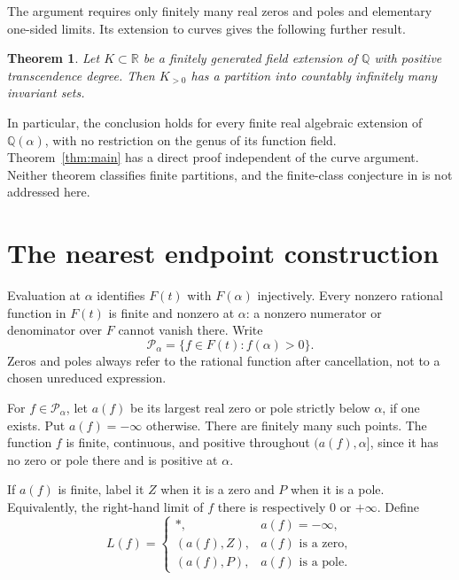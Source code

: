 \documentclass[11pt]{article}
\newtheorem{theorem}{Theorem}
\theoremstyle{remark}
\newcommand{\Q}{\mathbb Q}
\newcommand{\R}{\mathbb R}
\begin{document}
The argument requires only finitely many real zeros and poles and elementary one-sided limits. Its extension to curves gives the following further result.

\begin{theorem}\label{thm:fields}
Let $K\subset\R$ be a finitely generated field extension of $\Q$ with positive transcendence degree. Then $K_{>0}$ has a partition into countably infinitely many invariant sets.
\end{theorem}

In particular, the conclusion holds for every finite real algebraic extension of $\Q(\alpha)$, with no restriction on the genus of its function field. Theorem~\ref{thm:main} has a direct proof independent of the curve argument. Neither theorem classifies finite partitions, and the finite-class conjecture in \cite[Section~7]{KST} is not addressed here.

\section{The nearest endpoint construction}
Evaluation at $\alpha$ identifies $F(t)$ with $F(\alpha)$ injectively. Every nonzero rational function in $F(t)$ is finite and nonzero at $\alpha$: a nonzero numerator or denominator over $F$ cannot vanish there. Write
\[
 \mathcal P_\alpha=\{f\in F(t): f(\alpha)>0\}.
\]
Zeros and poles always refer to the rational function after cancellation, not to a chosen unreduced expression.

For $f\in\mathcal P_\alpha$, let $a(f)$ be its largest real zero or pole strictly below $\alpha$, if one exists. Put $a(f)=-\infty$ otherwise. There are finitely many such points. The function $f$ is finite, continuous, and positive throughout $(a(f),\alpha]$, since it has no zero or pole there and is positive at $\alpha$.

If $a(f)$ is finite, label it $Z$ when it is a zero and $P$ when it is a pole. Equivalently, the right-hand limit of $f$ there is respectively $0$ or $+\infty$. Define
\begin{equation}\label{eq:leftlabel}
 L(f)=\begin{cases}
 * ,&a(f)=-\infty,\\
 (a(f),Z),&a(f)\text{ is a zero},\\
 (a(f),P),&a(f)\text{ is a pole}.
 \end{cases}
\end{equation}
\end{document}

